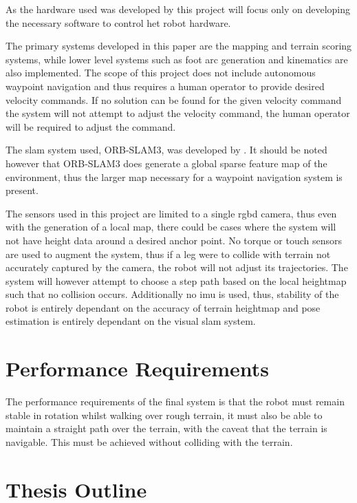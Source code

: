     As the hardware used was developed by \cite{erasmus2023guidance} this project will focus only on developing the necessary software to control het robot hardware.

    The primary systems developed in this paper are the mapping and terrain scoring systems, while lower level systems such as foot arc generation and kinematics are also
    implemented. The scope of this project does not include autonomous waypoint navigation and thus requires a human operator to provide desired velocity
    commands. If no solution can be found for the given velocity command the system will not attempt to adjust the velocity command, the human operator will be required to
    adjust the command.

    The \ac{slam} system used, ORB-SLAM3, was developed by \cite{campos2021orb}.
    It should be noted however that ORB-SLAM3 does generate a global sparse feature map of the environment, thus the larger map necessary for a waypoint navigation system is present.

    The sensors used in this project are limited to a single \ac{rgbd} camera, thus even with the generation of a local map, there could be cases where the system will not have
    height data around a desired anchor point. No torque or touch sensors are used to augment the system, thus if a leg were to collide with terrain not accurately captured by the camera,
    the robot will not adjust its trajectories.
    The system will however attempt to choose a step path based on the local heightmap such that no collision occurs. Additionally no \ac{imu} is used, thus, stability of the robot is entirely
    dependant on the accuracy of terrain heightmap and pose estimation is entirely dependant on the visual \ac{slam} system.

\section{Performance Requirements}
    The performance requirements of the final system is that the robot must remain stable in rotation whilst walking over rough terrain, it must also be able to maintain a straight path
    over the terrain, with the caveat that the terrain is navigable. This must be achieved without colliding with the terrain.

\section{Thesis Outline}


